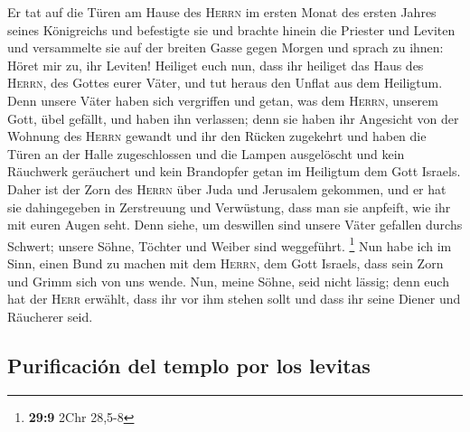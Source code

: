  Er tat auf die Türen am Hause des \textsc{Herrn} im
ersten Monat des ersten Jahres seines Königreichs und befestigte sie
 und brachte hinein die Priester und Leviten und
versammelte sie auf der breiten Gasse gegen Morgen  und
sprach zu ihnen: Höret mir zu, ihr Leviten! Heiliget euch nun, dass ihr
heiliget das Haus des \textsc{Herrn}, des Gottes eurer Väter, und tut
heraus den Unflat aus dem Heiligtum.  Denn unsere Väter
haben sich vergriffen und getan, was dem \textsc{Herrn}, unserem Gott,
übel gefällt, und haben ihn verlassen; denn sie haben ihr Angesicht von
der Wohnung des \textsc{Herrn} gewandt und ihr den Rücken zugekehrt
 und haben die Türen an der Halle zugeschlossen und die
Lampen ausgelöscht und kein Räuchwerk geräuchert und kein Brandopfer
getan im Heiligtum dem Gott Israels.  Daher ist der Zorn
des \textsc{Herrn} über Juda und Jerusalem gekommen, und er hat sie
dahingegeben in Zerstreuung und Verwüstung, dass man sie anpfeift, wie
ihr mit euren Augen seht.  Denn siehe, um deswillen sind
unsere Väter gefallen durchs Schwert; unsere Söhne, Töchter und Weiber
sind weggeführt. \footnote{\textbf{29:9} 2Chr 28,5-8} 
Nun habe ich im Sinn, einen Bund zu machen mit dem \textsc{Herrn}, dem
Gott Israels, dass sein Zorn und Grimm sich von uns wende.
 Nun, meine Söhne, seid nicht lässig; denn euch hat der
\textsc{Herr} erwählt, dass ihr vor ihm stehen sollt und dass ihr seine
Diener und Räucherer seid.

\hypertarget{purificaciuxf3n-del-templo-por-los-levitas}{%
\subsection{Purificación del templo por los
levitas}\label{purificaciuxf3n-del-templo-por-los-levitas}}

